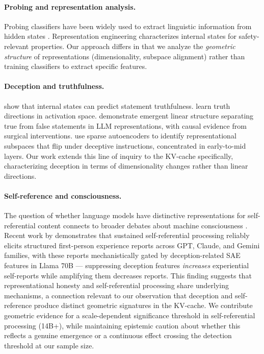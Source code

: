 \documentclass[11pt,a4paper]{article}
\begin{document}
\paragraph{Probing and representation analysis.}
Probing classifiers have been widely used to extract linguistic information from hidden states \citep{belinkov2022probing, hewitt2019structural}. Representation engineering \citep{zou2023representation} characterizes internal states for safety-relevant properties. Our approach differs in that we analyze the \emph{geometric structure} of representations (dimensionality, subspace alignment) rather than training classifiers to extract specific features.

\paragraph{Deception and truthfulness.}
\citet{azaria2023internal} show that internal states can predict statement truthfulness. \citet{burns2022discovering} learn truth directions in activation space. \citet{marks2023geometry} demonstrate emergent linear structure separating true from false statements in LLM representations, with causal evidence from surgical interventions. \citet{long2025deception} use sparse autoencoders to identify representational subspaces that flip under deceptive instructions, concentrated in early-to-mid layers. Our work extends this line of inquiry to the KV-cache specifically, characterizing deception in terms of dimensionality changes rather than linear directions.

\paragraph{Self-reference and consciousness.}
The question of whether language models have distinctive representations for self-referential content connects to broader debates about machine consciousness \citep{butlin2023consciousness, chalmers2023could}. Recent work by \citet{berg2025selfreferential} demonstrates that sustained self-referential processing reliably elicits structured first-person experience reports across GPT, Claude, and Gemini families, with these reports mechanistically gated by deception-related SAE features in Llama 70B --- suppressing deception features \emph{increases} experiential self-reports while amplifying them decreases reports. This finding suggests that representational honesty and self-referential processing share underlying mechanisms, a connection relevant to our observation that deception and self-reference produce distinct geometric signatures in the KV-cache. We contribute geometric evidence for a scale-dependent significance threshold in self-referential processing (14B+), while maintaining epistemic caution about whether this reflects a genuine emergence or a continuous effect crossing the detection threshold at our sample size.
\end{document}
